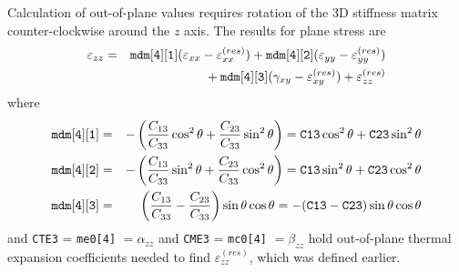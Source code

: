 \documentclass[11pt]{article}
\def\a#1{\alpha_{#1}}
\def\b#1{\beta_{#1}}
\def\code#1{{\small\tt #1}}
\def\e#1{\varepsilon_{#1}}
\def\er#1{\varepsilon_{#1}^{(res)}}
\def\g#1{\gamma_{#1}}
\begin{document}
Calculation of out-of-plane values requires rotation of the 3D stiffness matrix counter-clockwise around the $z$ axis. The results for plane stress are
\begin{eqnarray}
     \e{zz} & = & \code{mdm[4][1]} (\e{xx} - \er{xx}) +  \code{mdm[4][2]}(\e{yy} -\er{yy}) 
     \nonumber \\
     && \qquad\qquad\mbox{}
                 + \code{mdm[4][3]}(\g{xy}-\er{xy})  + \er{zz}
\end{eqnarray}
where 
\begin{eqnarray}
 \code{mdm[4][1]} & = &-\left({C_{13}\over C_{33}}\cos^2\theta + {C_{23}\over C_{33}}\sin^2\theta\right)
        = \code{C13}\cos^2\theta + \code{C23}\sin^2\theta  \\
 \code{mdm[4][2]} & = &-\left({C_{13}\over C_{33}}\sin^2\theta + {C_{23}\over C_{33}}\cos^2\theta\right)
        = \code{C13}\sin^2\theta + \code{C23}\cos^2\theta  \\
 \code{mdm[4][3]} & = &  \left({C_{13}\over C_{33}} - {C_{23}\over C_{33}}\right)\sin\theta\cos\theta
        = -(\code{C13}-\code{C23})\sin\theta\cos\theta
\end{eqnarray}
and \code{CTE3} = \code{me0[4]} $=\a{zz}$ and \code{CME3} = \code{mc0[4]} $=\b{zz}$ hold out-of-plane thermal expansion coefficients needed to find $\er{zz}$, which was defined earlier.
\end{document}
